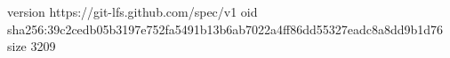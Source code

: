 version https://git-lfs.github.com/spec/v1
oid sha256:39c2cedb05b3197e752fa5491b13b6ab7022a4ff86dd55327eadc8a8dd9b1d76
size 3209
